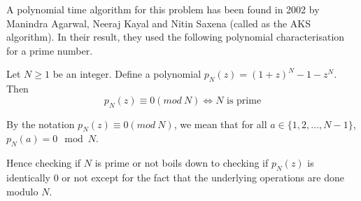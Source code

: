 A polynomial time algorithm for this problem has been found in 2002 by
Manindra Agarwal, Neeraj Kayal and Nitin Saxena (called as the AKS algorithm). 
In their result, they used the following polynomial characterisation for a
prime number.
\begin{theorem} Let $N \ge 1$ be
	an integer. Define a polynomial 
	$p_N(z) = (1+z)^N - 1 - z^N$. Then \[ p_N(z) \equiv 0 (mod~ N)
	\iff N \text{ is prime} \]
\end{theorem}
By the notation $p_N(z) \equiv 0 (mod~ N)$, we mean that for all $a \in
\{1,2,\ldots, N-1\}$, $p_N(a) = 0 \mod N$.

Hence checking if $N$ is prime or not boils down to checking if $p_N(z)$ is
identically $0$ or not except for the fact that the underlying operations are
done modulo $N$.

